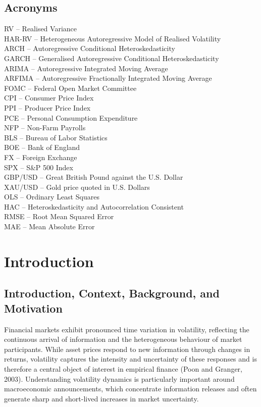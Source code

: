 \documentclass[12pt,a4paper]{report}
\begin{document}
\section{Acronyms}
\noindent RV  --  Realised Variance\\
\noindent HAR-RV  --  Heterogeneous Autoregressive Model of Realised Volatility\\
\noindent ARCH  --  Autoregressive Conditional Heteroskedasticity\\
\noindent GARCH  --  Generalised Autoregressive Conditional Heteroskedasticity\\
\noindent ARIMA  --  Autoregressive Integrated Moving Average\\
\noindent ARFIMA  --  Autoregressive Fractionally Integrated Moving Average\\
\noindent FOMC  --  Federal Open Market Committee\\
\noindent CPI  --  Consumer Price Index\\
\noindent PPI  --  Producer Price Index\\
\noindent PCE  --  Personal Consumption Expenditure\\
\noindent NFP  --  Non-Farm Payrolls\\
\noindent BLS  --  Bureau of Labor Statistics\\
\noindent BOE  --  Bank of England\\
\noindent FX  --  Foreign Exchange\\
\noindent SPX  --  S\&P 500 Index\\
\noindent GBP/USD  --  Great British Pound against the U.S. Dollar\\
\noindent XAU/USD  --  Gold price quoted in U.S. Dollars\\
\noindent OLS  --  Ordinary Least Squares\\
\noindent HAC  --  Heteroskedasticity and Autocorrelation Consistent\\
\noindent RMSE  --  Root Mean Squared Error\\
\noindent MAE  --  Mean Absolute Error\\
\chapter{Introduction}
\section{Introduction, Context, Background, and Motivation}
Financial markets exhibit pronounced time variation in volatility, reflecting the continuous arrival of information and the heterogeneous behaviour of market participants. While asset prices respond to new information through changes in returns, volatility captures the intensity and uncertainty of these responses and is therefore a central object of interest in empirical finance (Poon and Granger, 2003). Understanding volatility dynamics is particularly important around macroeconomic announcements, which concentrate information releases and often generate sharp and short-lived increases in market uncertainty.
\end{document}
